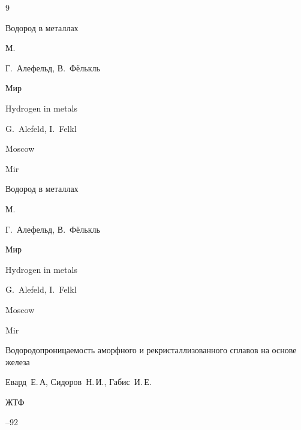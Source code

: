 \begin{thebibliography}{9}




\book Водород в металлах

\publaddr М.

\eds Г.~Алефельд, В.~Фёлькль

\publ Мир




\misctransl

\book Hydrogen in metals 

\eds G.~Alefeld, I.~Felkl

\publaddr Moscow

\publ Mir







\book Водород в металлах

\publaddr М.

\eds Г.~Алефельд, В.~Фёлькль

\publ Мир




\misctransl

\book Hydrogen in metals 

\eds G.~Alefeld, I.~Felkl

\publaddr Moscow

\publ Mir







\paper Водородопроницаемость аморфного и рекристаллизованного сплавов на основе железа

\by Евард~Е.\,А, Сидоров~Н.\,И., Габис~И.\,Е.

\jour ЖТФ




--92


\end{thebibliography}
